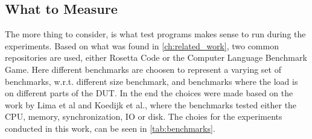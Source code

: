 \subsection{What to Measure}

The more thing to consider, is what test programs makes sense to run during the experiments. Based on what was found in \cref*{ch:related_work}, two common repositories are used, either Rosetta Code\cite*[]{rosetta_code} or the Computer Language Benchmark Game\cite*[]{benchmark_game}. Here different benchmarks are choosen to represent a varying set of benchmarks, w.r.t. different size benchmark, and benchmarks where the load is on different parts of the DUT. In the end the choices were made based on the work by Lima et al\cite*[]{greenland2016statistical} and Koedijk et al.\cite*[]{Koedijk2022diff}, where the benchmarks tested either the CPU, memory, synchronization, IO or disk. The choies for the experiments conducted in this work, can be seen in \cref*{tab:benchmarks}.




